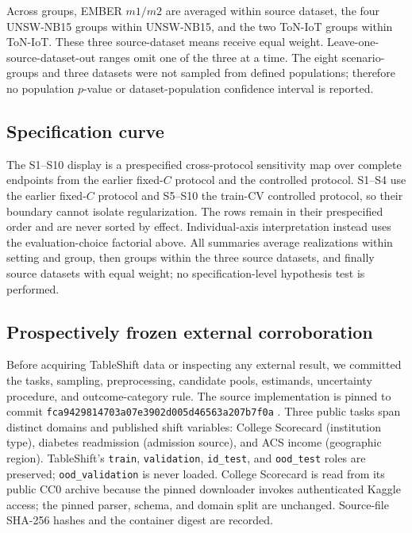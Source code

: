 \documentclass[referee,lineno,pdflatex,sn-vancouver-num]{sn-jnl}
\theoremstyle{thmstyleone}%
\theoremstyle{thmstyletwo}%
\theoremstyle{thmstylethree}%
\begin{document}
Across groups, EMBER $m1/m2$ are averaged within source dataset, the four UNSW-NB15 groups within UNSW-NB15, and the two ToN-IoT groups within ToN-IoT. These three source-dataset means receive equal weight. Leave-one-source-dataset-out ranges omit one of the three at a time. The eight scenario-groups and three datasets were not sampled from defined populations; therefore no population $p$-value or dataset-population confidence interval is reported.

\subsection{Specification curve}

The S1--S10 display is a prespecified cross-protocol sensitivity map over complete endpoints from the earlier fixed-$C$ protocol and the controlled protocol. S1--S4 use the earlier fixed-$C$ protocol and S5--S10 the train-CV controlled protocol, so their boundary cannot isolate regularization. The rows remain in their prespecified order and are never sorted by effect. Individual-axis interpretation instead uses the evaluation-choice factorial above. All summaries average realizations within setting and group, then groups within the three source datasets, and finally source datasets with equal weight; no specification-level hypothesis test is performed.

\subsection{Prospectively frozen external corroboration}

Before acquiring TableShift data or inspecting any external result, we committed the tasks, sampling, preprocessing, candidate pools, estimands, uncertainty procedure, and outcome-category rule. The source implementation is pinned to commit \texttt{fca9429814703a07e3902d005d46563a207b7f0a} \cite{gardner2023tableshift}. Three public tasks span distinct domains and published shift variables: College Scorecard (institution type), diabetes readmission (admission source), and ACS income (geographic region). TableShift's \texttt{train}, \texttt{validation}, \texttt{id\_test}, and \texttt{ood\_test} roles are preserved; \texttt{ood\_validation} is never loaded. College Scorecard is read from its public CC0 archive because the pinned downloader invokes authenticated Kaggle access; the pinned parser, schema, and domain split are unchanged. Source-file SHA-256 hashes and the container digest are recorded.
\end{document}
